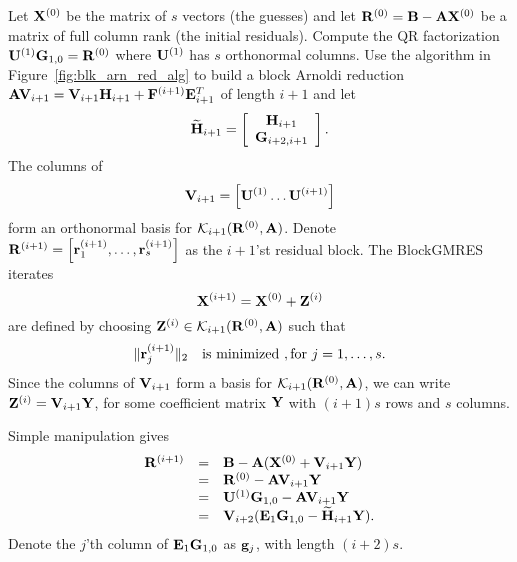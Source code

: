 \documentclass{article}
\newcommand{\bA}{{\bf A}}
\newcommand{\bB}{{\bf B}}
\newcommand{\bE}{{\bf E}}
\newcommand{\bF}{{\bf F}}
\newcommand{\bG}{{\bf G}}
\newcommand{\bH}{{\bf H}}
\newcommand{\bR}{{\bf R}}
\newcommand{\bU}{{\bf U}}
\newcommand{\bV}{{\bf V}}
\newcommand{\bX}{{\bf X}}
\newcommand{\bY}{{\bf Y}}
\newcommand{\bZ}{{\bf Z}}
\newcommand{\br}{{\bf r}}
\newcommand{\dm}{\begin{displaymath}}
\newcommand{\edm}{\end{displaymath}}
\newcommand{\eq}{\begin{equation}}
\newcommand{\eeq}{\end{equation}}
\begin{document}
Let $\bX^{(0)}$ be the matrix of $s$ vectors (the guesses) and let
$\bR^{(0)} = \bB - \bA \bX^{(0)}$ be a matrix of full column rank
(the initial residuals). Compute the QR factorization $\bU^{(1)}
\bG_{1,0} = \bR^{(0)}$ where $\bU^{(1)}$ has $s$ orthonormal
columns. Use the algorithm in Figure~\ref{fig:blk_arn_red_alg} to
build a block Arnoldi reduction $\bA \bV_{i+1} = \bV_{i+1}
\bH_{i+1} + \bF^{(i+1)} \bE^T_{i+1}$ of length $i+1$ and let
 \dm
 \widetilde{\bH}_{i+1} =
 \left[
 \begin{array}{c}
                            \bH_{i+1} \\
                            \bG_{i+2,i+1} \end{array} \right].
 \edm
The columns of
 \dm
 \bV_{i+1} = \left[ \bU^{(1)} \ldots \bU^{(i+1)} \right]
 \edm
form an orthonormal basis for ${\cal K}_{i+1}(\bR^{(0)}, \bA)$.
Denote $\bR^{(i+1)} = \left[ \br_1^{(i+1)}, \ldots, \br_s^{(i+1)}
\right]$ as the $i+1$'st residual block. The BlockGMRES iterates
 \dm
 \bX^{(i+1)} = \bX^{(0)} + \bZ^{(i)}
 \edm
are defined by choosing $\bZ^{(i)} \in {\cal K}_{i+1}(\bR^{(0)},
\bA)$ such that
 \eq
 \|\br_j^{(i+1)}\|_2 ~~~{\rm
 is~minimized}~, {\rm for}~ j = 1,\ldots, s.
 \label{eq:gmresmin}
 \eeq
Since the columns of $\bV_{i+1}$ form a basis for ${\cal
K}_{i+1}(\bR^{(0)}, \bA)$, we can write $\bZ^{(i)} = \bV_{i+1}
\bY$, for some coefficient matrix $\bY$ with $(i+1)s$ rows and $s$
columns.

Simple manipulation gives
 \eq
 \begin{array}{rcl}
 \bR^{(i+1)} & = & \bB - \bA( \bX^{(0)} + \bV_{i+1} \bY) \\
      & = & \bR^{(0)} -  \bA \bV_{i+1} \bY \\
      & = & \bU^{(1)} \bG_{1,0} - \bA \bV_{i+1} \bY \\
      & = & \bV_{i+2}(\bE_1 \bG_{1,0} - \widetilde{\bH}_{i+1} \bY).
 \end{array} \label{eq:gmresresids}
 \eeq
Denote the $j$'th column of $\bE_1 \bG_{1,0}$ as ${\bf g}_j$, with
length $(i+2)s$.
\end{document}

